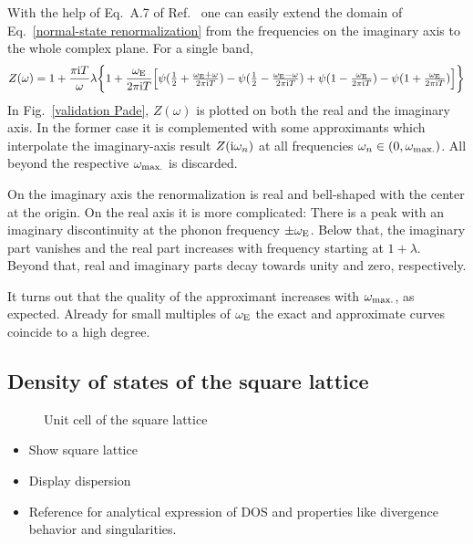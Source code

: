 With the help of Eq.~A.7 of Ref.~ one can easily
extend the domain of Eq.~\ref{normal-state renormalization} from the
 frequencies on the imaginary axis to the whole complex plane.
For a single band,
%
\begin{equation*}
    Z(\omega) = 1 + \frac {\pi \mathrm i T} \omega \lambda \bigg \{
        1 + \frac{\omega \sb{\text{E}}}{2 \pi \mathrm i T} \Big[
              \psi(\tfrac 1 2 + \tfrac{\omega \sb{\text{E}} + \omega}{2 \pi \mathrm i T})
            - \psi(\tfrac 1 2 - \tfrac{\omega \sb{\text{E}} - \omega}{2 \pi \mathrm i T})
            + \psi(1 - \tfrac{\omega \sb{\text{E}}}{2 \pi \mathrm i T})
            - \psi(1 + \tfrac{\omega \sb{\text{E}}}{2 \pi \mathrm i T})
        \Big]
    \bigg \}
\end{equation*}
%
In Fig.~\ref{validation Pade}, $Z(\omega)$ is plotted on both the real and the
imaginary axis. In the former case it is complemented with some 
approximants which interpolate the imaginary-axis result $Z(\mathrm i \omega_n)$ at all
 frequencies $\omega_n \in (0, \omega \sb{\text{max.}})$. All beyond
the respective $\omega \sb{\text{max.}}$ is discarded.

On the imaginary axis the renormalization is real and bell-shaped with the
center at the origin. On the real axis it is more complicated: There is a peak
with an imaginary discontinuity at the phonon frequency $\pm \omega \sb{\text{E}}$.
Below that, the imaginary part vanishes and the real part increases with
frequency starting at $1 + \lambda$. Beyond that, real and imaginary parts decay
towards unity and zero, respectively.

It turns out that the quality of the  approximant increases with
$\omega \sb{\text{max.}}$, as expected. Already for small multiples of $\omega \sb{\text{E}}$
the exact and approximate curves coincide to a high degree.

\subsection{Density of states of the square lattice}

\begin{figure}
    \small
    \centering
    
    \caption{Unit cell of the square lattice}
\end{figure}

\begin{itemize}
    \item Show square lattice
    \item Display dispersion
    \item Reference  for analytical expression of DOS and
          properties like divergence behavior and  singularities.
\end{itemize}

